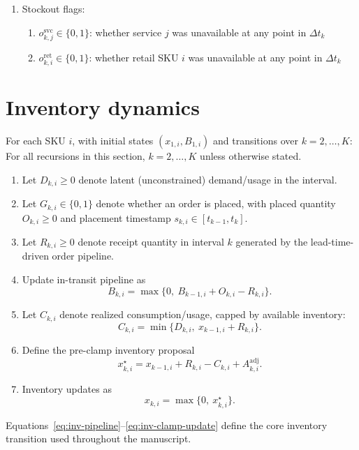 \documentclass[11pt]{article}
\begin{document}
\begin{enumerate}
  \item Stockout flags:
  \begin{enumerate}
    \item $o^{\mathrm{svc}}_{k,j} \in \{0,1\}$: whether service $j$ was unavailable at any point in $\Delta t_k$
    \item $o^{\mathrm{ret}}_{k,i} \in \{0,1\}$: whether retail SKU $i$ was unavailable at any point in $\Delta t_k$
  \end{enumerate}
\end{enumerate}

\section{Inventory dynamics}

For each SKU $i$, with initial states $(x_{1,i},B_{1,i})$ and transitions over $k=2,\dots,K$:
For all recursions in this section, $k=2,\dots,K$ unless otherwise stated.
\begin{enumerate}
  \item Let $D_{k,i}\ge 0$ denote latent (unconstrained) demand/usage in the interval.
  \item Let $G_{k,i}\in\{0,1\}$ denote whether an order is placed, with placed quantity $O_{k,i}\ge0$ and placement timestamp $s_{k,i}\in[t_{k-1},t_k]$.
  \item Let $R_{k,i}\ge0$ denote receipt quantity in interval $k$ generated by the lead-time-driven order pipeline.
  \item Update in-transit pipeline as
  \begin{equation}\label{eq:inv-pipeline}
    B_{k,i}=\max\bigl\{0,\ B_{k-1,i}+O_{k,i}-R_{k,i}\bigr\}.
  \end{equation}
  \item Let $C_{k,i}$ denote realized consumption/usage, capped by available inventory:
  \begin{equation}\label{eq:inv-consumption-cap}
    C_{k,i} = \min\bigl\{D_{k,i},\ x_{k-1,i} + R_{k,i}\bigr\}.
  \end{equation}
  \item Define the pre-clamp inventory proposal
  \begin{equation}\label{eq:inv-preclamp}
    x^\star_{k,i} = x_{k-1,i} + R_{k,i} - C_{k,i} + A^{\mathrm{adj}}_{k,i}.
  \end{equation}
  \item Inventory updates as
  \begin{equation}\label{eq:inv-clamp-update}
    x_{k,i} = \max\bigl\{0,\ x^\star_{k,i}\bigr\}.
  \end{equation}
\end{enumerate}
Equations~\eqref{eq:inv-pipeline}--\eqref{eq:inv-clamp-update} define the core inventory transition used throughout the manuscript.
\end{document}
